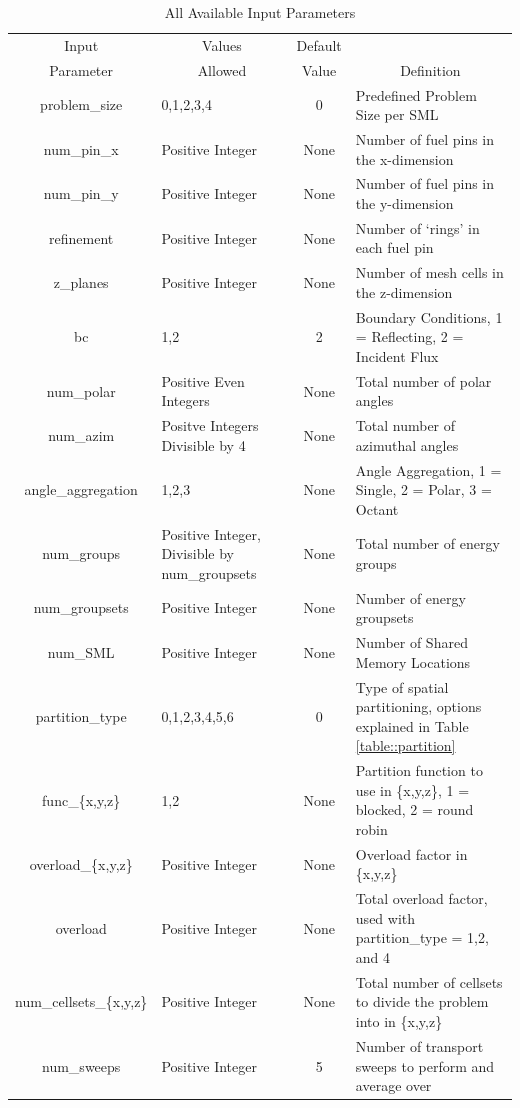\documentclass{article}
\begin{document}
\begin{table}[h!]
\begin{center}
  \begin{tabular}{ |c|p{5cm}|c|p{6.4cm}|}
    \hline
    Input &\multicolumn{1}{c|}{ Values} &  Default& \\ 
    Parameter & \multicolumn{1}{c|}{Allowed}&Value& \multicolumn{1}{c|}{Definition}\\
    \hline
    problem\_size & 0,1,2,3,4 & 0& Predefined Problem Size per SML\\  \hline
    num\_pin\_x& Positive Integer & None &  Number of fuel pins in the x-dimension\\ 
    num\_pin\_y& Positive Integer & None &  Number of fuel pins in the y-dimension\\
    refinement & Positive Integer & None & Number of `rings' in each fuel pin \\
    z\_planes& Positive Integer & None &  Number of mesh cells in the z-dimension\\ 
    bc & 1,2 & 2 & Boundary Conditions, 1 = Reflecting, 2 = Incident Flux \\ \hline
    num\_polar & Positive Even Integers& None &  Total number of polar angles \\
    num\_azim & Positve Integers Divisible by 4&  None& Total number of azimuthal angles \\
    angle\_aggregation & 1,2,3 & None & Angle Aggregation, 1 = Single, 2 = Polar, 3 = Octant \\ \hline
    num\_groups & Positive Integer, Divisible by num\_groupsets & None & Total number of energy groups \\ 
    num\_groupsets & Positive Integer & None & Number of energy groupsets \\ \hline
    num\_SML & Positive Integer & None & Number of Shared Memory Locations \\
    partition\_type & 0,1,2,3,4,5,6 & 0 & Type of spatial partitioning, options explained in Table \ref{table::partition} \\
    func\_\{x,y,z\} & 1,2 & None & Partition function to use in \{x,y,z\}, 1 = blocked, 2 = round robin \\
    overload\_\{x,y,z\} & Positive Integer & None & Overload factor in \{x,y,z\} \\
    overload & Positive Integer & None & Total overload factor, used with partition\_type = 1,2, and 4 \\
    num\_cellsets\_\{x,y,z\} & Positive Integer & None & Total number of cellsets to divide the problem into in \{x,y,z\} \\ 
    num\_sweeps & Positive Integer & 5 & Number of transport sweeps to perform and average over \\
    \hline
  \end{tabular} 
      \caption{All Available Input Parameters}
      \label{table::parameters}
\end{center}
\end{table}
\end{document}
